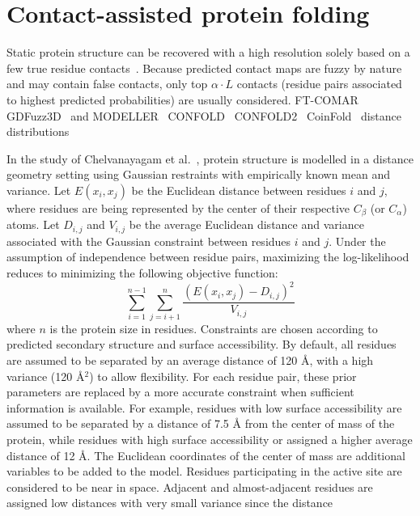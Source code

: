 \section{Contact-assisted protein folding}

Static protein structure can be recovered with a high resolution solely based on a few
true residue contacts~\cite{kim2014one}. Because predicted contact maps
are fuzzy by nature and may contain false contacts, only top $\alpha \cdot L$
contacts (residue pairs associated to highest predicted probabilities)
are usually considered.
FT-COMAR~\cite{vassura2008ft}
GDFuzz3D~\cite{pietal2015gdfuzz3d} and MODELLER~\cite{modeller}
CONFOLD~\cite{adhikari2015confold}
CONFOLD2~\cite{adhikari2018confold2}
CoinFold~\cite{wang2016coinfold}
distance distributions~\cite{reese1996distance}

In the study of Chelvanayagam et al.~\cite{chelvanayagam1998combinatorial}, protein structure is modelled
in a distance geometry setting using Gaussian restraints with empirically known mean and variance.
Let $E(x_i, x_j)$ be the Euclidean distance between residues $i$ and $j$, where residues are being represented
by the center of their respective $C_{\beta}$ (or $C_{\alpha}$) atoms.
Let $D_{i, j}$ and $V_{i, j}$ be the average Euclidean distance and variance associated with the
Gaussian constraint between residues $i$ and $j$. Under the assumption of independence between
residue pairs, maximizing the log-likelihood reduces to minimizing the following objective function:
\begin{equation}
    \sum\limits_{i=1}^{n-1} \sum\limits_{j=i+1}^n \frac{(E(x_i, x_j) - D_{i, j})^2}{V_{i, j}}
\end{equation}
where $n$ is the protein size in residues. Constraints are chosen according to predicted secondary
structure and surface accessibility. By default, all residues are assumed to be separated by an average distance
of 120 \AA{}, with a high variance (120 \AA{}$^2$) to allow flexibility.
For each residue pair, these prior parameters are replaced by a more accurate constraint when sufficient
information is available. For example, residues with low surface accessibility are assumed to be separated
by a distance of 7.5 \AA{} from the center of mass of the protein, while residues with high surface accessibility
or assigned a higher average distance of 12 \AA{}. The Euclidean coordinates of the center of mass are additional
variables to be added to the model. Residues participating in the active site are considered to be near in space.
Adjacent and almost-adjacent residues are assigned low distances with very small variance since the distance
